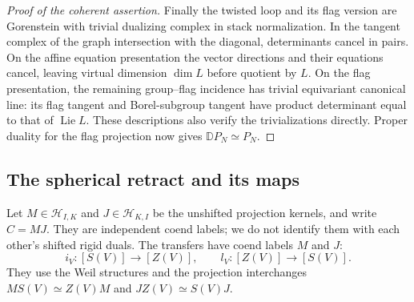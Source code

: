 \documentclass[11pt]{article}
\numberwithin{equation}{section}
\theoremstyle{definition}
\theoremstyle{remark}
\newcommand{\Lie}{\operatorname{Lie}}
\begin{document}
\begin{proof}[Proof of the coherent assertion]
Finally the twisted loop and its flag version are Gorenstein with
trivial dualizing complex in stack normalization.  In the tangent
complex of the graph intersection with the diagonal, determinants
cancel in pairs.  On the affine equation presentation the vector
directions and their equations cancel, leaving virtual dimension
$\dim L$ before quotient by $L$.  On the flag presentation, the
remaining group--flag incidence has trivial equivariant canonical
line: its flag tangent and Borel-subgroup tangent have product
determinant equal to that of $\Lie L$.  These descriptions also verify
the trivializations directly.  Proper duality for the flag projection
now gives $\mathbb DP_N\simeq P_N$.
\end{proof}

\subsection{The spherical retract and its maps}

Let $M\in\mathscr H_{I,K}$ and $J\in\mathscr H_{K,I}$ be the
unshifted projection kernels, and write $C=MJ$.  They are independent
coend labels; we do not identify them with each other's shifted
rigid duals.  The transfers have
coend labels $M$ and $J$:
\[
 i_V:[S(V)]\longrightarrow[Z(V)],\qquad
 l_V:[Z(V)]\longrightarrow[S(V)].
\]
They use the Weil structures and the projection interchanges
$MS(V)\simeq Z(V)M$ and $JZ(V)\simeq S(V)J$.
\end{document}
